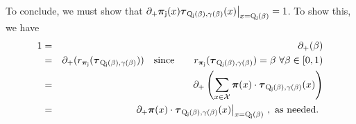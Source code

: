 	To conclude, we must show that $\partial_+ \boldsymbol{\pi}_{\mathsf{j}}(x)\boldsymbol{\tau}_{\mathrm{Q}_{\mathsf{j}}(\beta),\gamma(\beta)}(x) \big{|}_{x = \mathrm{Q}_{\mathsf{j}}(\beta)} = 1$. To show this, we have
	\begin{eqnarray*}
	1 &=& \partial_+(\beta)\\
	&=& \partial_+(r_{\boldsymbol{\pi}_{\mathsf{j}}}(\boldsymbol{\tau}_{\mathrm{Q}_{\mathsf{j}}(\beta),\gamma(\beta)}))\quad\text{since}\quad\quad r_{\boldsymbol{\pi}_{\mathsf{j}}}(\boldsymbol{\tau}_{\mathrm{Q}_{\mathsf{j}}(\beta),\gamma(\beta)}) = \beta ~\forall \beta \in [0,1)\\
	&=& \partial_+\left(\sum_{x \in \mathcal{X}} \boldsymbol{\pi}(x) \cdot \boldsymbol{\tau}_{\mathrm{Q}_{\mathsf{j}}(\beta),\gamma(\beta)}(x)\right)\\
	&=& \partial_+  \boldsymbol{\pi}(x) \cdot \boldsymbol{\tau}_{\mathrm{Q}_{\mathsf{j}}(\beta),\gamma(\beta)}(x)\big{|}_{x = \mathrm{Q}_{\mathsf{j}}(\beta)}~, \text{ as needed. }
	\end{eqnarray*}


